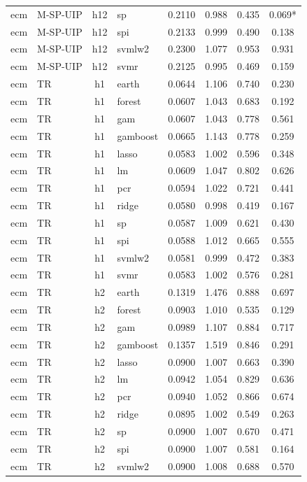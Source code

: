\begin{ThreePartTable}
\begin{longtable}[t]{llclcccc}
ecm & M-SP-UIP & h12 & sp & 0.2110 & 0.988 & 0.435 & 0.069*\\
ecm & M-SP-UIP & h12 & spi & 0.2133 & 0.999 & 0.490 & 0.138\\
ecm & M-SP-UIP & h12 & svmlw2 & 0.2300 & 1.077 & 0.953 & 0.931\\
ecm & M-SP-UIP & h12 & svmr & 0.2125 & 0.995 & 0.469 & 0.159\\
\addlinespace
ecm & TR & h1 & earth & 0.0644 & 1.106 & 0.740 & 0.230\\
ecm & TR & h1 & forest & 0.0607 & 1.043 & 0.683 & 0.192\\
ecm & TR & h1 & gam & 0.0607 & 1.043 & 0.778 & 0.561\\
ecm & TR & h1 & gamboost & 0.0665 & 1.143 & 0.778 & 0.259\\
ecm & TR & h1 & lasso & 0.0583 & 1.002 & 0.596 & 0.348\\
ecm & TR & h1 & lm & 0.0609 & 1.047 & 0.802 & 0.626\\
ecm & TR & h1 & pcr & 0.0594 & 1.022 & 0.721 & 0.441\\
ecm & TR & h1 & ridge & 0.0580 & 0.998 & 0.419 & 0.167\\
ecm & TR & h1 & sp & 0.0587 & 1.009 & 0.621 & 0.430\\
ecm & TR & h1 & spi & 0.0588 & 1.012 & 0.665 & 0.555\\
ecm & TR & h1 & svmlw2 & 0.0581 & 0.999 & 0.472 & 0.383\\
ecm & TR & h1 & svmr & 0.0583 & 1.002 & 0.576 & 0.281\\
\addlinespace
ecm & TR & h2 & earth & 0.1319 & 1.476 & 0.888 & 0.697\\
ecm & TR & h2 & forest & 0.0903 & 1.010 & 0.535 & 0.129\\
ecm & TR & h2 & gam & 0.0989 & 1.107 & 0.884 & 0.717\\
ecm & TR & h2 & gamboost & 0.1357 & 1.519 & 0.846 & 0.291\\
ecm & TR & h2 & lasso & 0.0900 & 1.007 & 0.663 & 0.390\\
ecm & TR & h2 & lm & 0.0942 & 1.054 & 0.829 & 0.636\\
ecm & TR & h2 & pcr & 0.0940 & 1.052 & 0.866 & 0.674\\
ecm & TR & h2 & ridge & 0.0895 & 1.002 & 0.549 & 0.263\\
ecm & TR & h2 & sp & 0.0900 & 1.007 & 0.670 & 0.471\\
ecm & TR & h2 & spi & 0.0900 & 1.007 & 0.581 & 0.164\\
ecm & TR & h2 & svmlw2 & 0.0900 & 1.008 & 0.688 & 0.570\\

\end{longtable}
\end{ThreePartTable}
